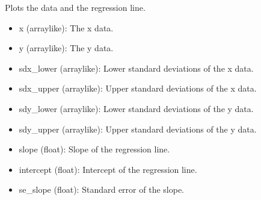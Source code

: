 \documentclass[a4paper,10pt,english]{sphinxmanual}
\begin{document}
\begin{fulllineitems}
\label{\detokenize{utils:src.utils.regression_analysis.plot_regression}}
\pysigstartsignatures
{}
\pysigstopsignatures
\sphinxAtStartPar
Plots the data and the regression line.
\begin{description}
\begin{itemize}
\item {} 
\sphinxAtStartPar
x (array\sphinxhyphen{}like): The x data.

\item {} 
\sphinxAtStartPar
y (array\sphinxhyphen{}like): The y data.

\item {} 
\sphinxAtStartPar
sdx\_lower (array\sphinxhyphen{}like): Lower standard deviations of the x data.

\item {} 
\sphinxAtStartPar
sdx\_upper (array\sphinxhyphen{}like): Upper standard deviations of the x data.

\item {} 
\sphinxAtStartPar
sdy\_lower (array\sphinxhyphen{}like): Lower standard deviations of the y data.

\item {} 
\sphinxAtStartPar
sdy\_upper (array\sphinxhyphen{}like): Upper standard deviations of the y data.

\item {} 
\sphinxAtStartPar
slope (float): Slope of the regression line.

\item {} 
\sphinxAtStartPar
intercept (float): Intercept of the regression line.

\item {} 
\sphinxAtStartPar
se\_slope (float): Standard error of the slope.


\end{itemize}
\end{description}
\end{fulllineitems}
\end{document}
